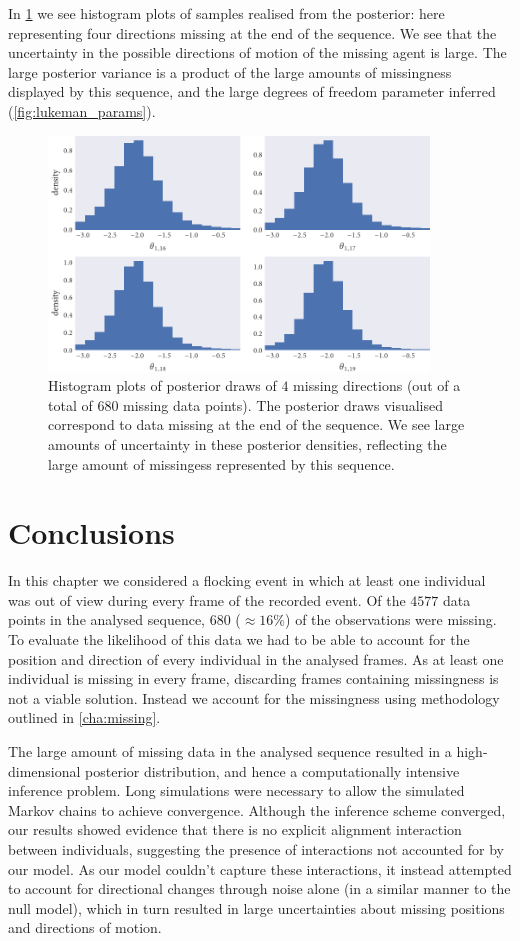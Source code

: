In \cref{fig:dir_hist} we see histogram plots of samples realised
from the posterior: here representing four directions missing at the end of the
sequence. We see that the uncertainty in the possible directions of motion
of the missing agent is large. The large posterior variance is a product of the
large amounts of missingness displayed by this sequence, and the large degrees
of freedom parameter inferred (\cref{fig:lukeman_params}).

\begin{figure}[tb]
  \includegraphics[width=0.9\textwidth]{dir_hist.pdf}
  \caption{Histogram plots of posterior draws of $4$ missing directions (out of
    a total of $680$ missing data points). The posterior draws visualised
    correspond to data missing at the end of the sequence. We see large amounts
    of uncertainty in these posterior densities, reflecting the large amount of
    missingess represented by this sequence.}
  \label{fig:dir_hist}
\end{figure}

\section*{Conclusions}

In this chapter we considered a flocking event in which at least one individual
was out of view during every frame of the recorded event. Of the $4577$ data
points in the analysed sequence, $680$ ($\approx16\%$) of the observations were
missing. To evaluate the likelihood of this data we had to be able to account
for the position and direction of every individual in the analysed frames. As
at least one individual is missing in every frame, discarding frames containing
missingness is not a viable solution. Instead we account for the missingness
using methodology outlined in \cref{cha:missing}.

The large amount of missing data in the analysed sequence resulted in a
high-dimensional posterior distribution, and hence a computationally intensive
inference problem. Long simulations were necessary to allow the simulated
Markov chains to achieve convergence. Although the inference scheme converged,
our results showed evidence that there is no explicit alignment interaction
between individuals, suggesting the presence of interactions not accounted for
by our model. As our model couldn't capture these interactions, it instead
attempted to account for directional changes through noise alone (in a similar
manner to the null model), which in turn resulted in large uncertainties about
missing positions and directions of motion.

